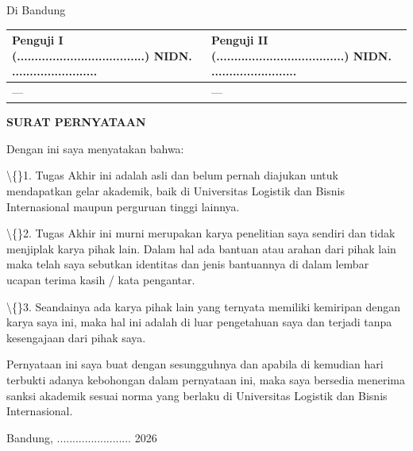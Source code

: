 \documentclass[12pt,a4paper]{article}
\begin{document}
Di Bandung



\begin{table}[h]

\centering

\begin{tabular}{ll}

\toprule

Penguji I (....................................) NIDN. ........................ & Penguji II (....................................) NIDN. ........................ \\

\midrule

--- & --- \\

\bottomrule

\end{tabular}

\end{table}

\newpage

\textbf{SURAT PERNYATAAN}



Dengan ini saya menyatakan bahwa:



\textbackslash\{\}1.	Tugas Akhir ini adalah asli dan belum pernah diajukan untuk mendapatkan gelar akademik, baik di Universitas Logistik dan Bisnis Internasional maupun perguruan tinggi lainnya.



\textbackslash\{\}2.	Tugas Akhir ini murni merupakan karya penelitian saya sendiri dan tidak menjiplak karya pihak lain. Dalam hal ada bantuan atau arahan dari pihak lain maka telah saya sebutkan identitas dan jenis bantuannya di dalam lembar ucapan terima kasih / kata pengantar.



\textbackslash\{\}3.	Seandainya ada karya pihak lain yang ternyata memiliki kemiripan dengan karya saya ini, maka hal ini adalah di luar pengetahuan saya dan terjadi tanpa kesengajaan dari pihak saya.



Pernyataan ini saya buat dengan sesungguhnya dan apabila di kemudian hari terbukti adanya kebohongan dalam pernyataan ini, maka saya bersedia menerima sanksi akademik sesuai norma yang berlaku di Universitas Logistik dan Bisnis Internasional.



Bandung, ........................ 2026
\end{document}
